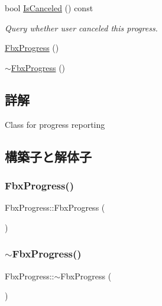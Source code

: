 \begin{DoxyCompactItemize}
bool \hyperlink{class_fbx_progress_a01a1707ca7bdb12250642661ac1a3a31}{Is\+Canceled} () const
\begin{DoxyCompactList}\small\item\em Query whether user canceled this progress. \end{DoxyCompactList}\item 
\hyperlink{class_fbx_progress_a9e3cb1977c2e11039314cc2be1020378}{Fbx\+Progress} ()
\item 
\hyperlink{class_fbx_progress_acb4d530f0f495e13e8db3bfb2382d9b7}{$\sim$\+Fbx\+Progress} ()
\end{DoxyCompactItemize}


\subsection{詳解}
Class for progress reporting 

\subsection{構築子と解体子}
\mbox{\label{class_fbx_progress_a9e3cb1977c2e11039314cc2be1020378}} 
\subsubsection{\texorpdfstring{Fbx\+Progress()}{FbxProgress()}}
{\footnotesize\ttfamily Fbx\+Progress\+::\+Fbx\+Progress (\begin{DoxyParamCaption}{ }\end{DoxyParamCaption})}

\mbox{\label{class_fbx_progress_acb4d530f0f495e13e8db3bfb2382d9b7}} 
\subsubsection{\texorpdfstring{$\sim$\+Fbx\+Progress()}{~FbxProgress()}}
{\footnotesize\ttfamily Fbx\+Progress\+::$\sim$\+Fbx\+Progress (\begin{DoxyParamCaption}{ }\end{DoxyParamCaption})}



